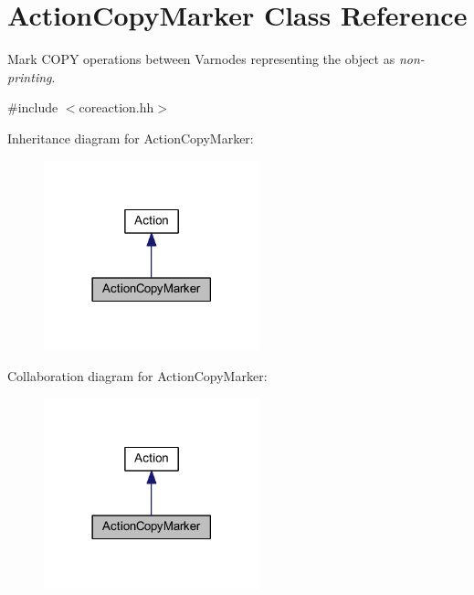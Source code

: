 \hypertarget{class_action_copy_marker}{}\section{Action\+Copy\+Marker Class Reference}
\label{class_action_copy_marker}


Mark C\+O\+PY operations between Varnodes representing the object as {\itshape non-\/printing}.  




{\ttfamily \#include $<$coreaction.\+hh$>$}



Inheritance diagram for Action\+Copy\+Marker\+:
\nopagebreak
\begin{figure}[H]
\begin{center}
\leavevmode
\includegraphics[width=177pt]{class_action_copy_marker__inherit__graph}
\end{center}
\end{figure}


Collaboration diagram for Action\+Copy\+Marker\+:
\nopagebreak
\begin{figure}[H]
\begin{center}
\leavevmode
\includegraphics[width=177pt]{class_action_copy_marker__coll__graph}
\end{center}
\end{figure}
